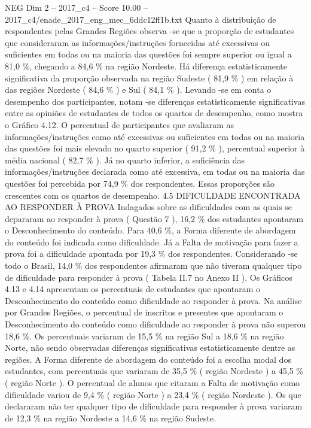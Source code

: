 \begin{textsample}{NEG Dim 2 – 2017\_c4 – Score 10.00 – 2017\_c4/enade\_2017\_eng\_mec\_6ddc12ff1b.txt}
Quanto à distribuição de respondentes pelas Grandes Regiões observa -se que a proporção de estudantes que consideraram as informações/instruções fornecidas até excessivas ou suficientes em todas ou na maioria das questões foi sempre superior ou igual a 81,0 \%, chegando a 84,6 \% na região Nordeste.
Há diferença estatisticamente significativa da proporção observada na região Sudeste ( 81,9 \% ) em relação à das regiões Nordeste ( 84,6 \% ) e Sul ( 84,1 \% ).
Levando -se em conta o desempenho dos participantes, notam -se diferenças estatisticamente significativas entre as opiniões de estudantes de todos os quartos de desempenho, como mostra o Gráfico 4.12.
O percentual de participantes que avaliaram as informações/instruções como até excessivas ou suficientes em todas ou na maioria das questões foi mais elevado no quarto superior ( 91,2 \% ), percentual superior à média nacional ( 82,7 \% ).
Já no quarto inferior, a suficiência das informações/instruções declarada como até excessiva, em todas ou na maioria das questões foi percebida por 74,9 \% dos respondentes.
Essas proporções são crescentes com os quartos de desempenho. 4.5 DIFICULDADE ENCONTRADA AO RESPONDER À PROVA Indagados sobre as dificuldades com as quais se depararam ao responder à prova ( Questão 7 ), 16,2 \% dos estudantes apontaram o Desconhecimento do conteúdo.
Para 40,6 \%, a Forma diferente de abordagem do conteúdo foi indicada como dificuldade.
Já a Falta de motivação para fazer a prova foi a dificuldade apontada por 19,3 \% dos respondentes.
Considerando -se todo o Brasil, 14,0 \% dos respondentes afirmaram que não tiveram qualquer tipo de dificuldade para responder à prova ( Tabela II.7 no Anexo II ).
Os Gráficos 4.13 e 4.14 apresentam os percentuais de estudantes que apontaram o Desconhecimento do conteúdo como dificuldade ao responder à prova.
Na análise por Grandes Regiões, o percentual de inscritos e presentes que apontaram o Desconhecimento do conteúdo como dificuldade ao responder à prova não superou 18,6 \%.
Os percentuais variaram de 15,5 \% na região Sul a 18,6 \% na região Norte, não sendo observadas diferenças significativas estatisticamente dentre as regiões.
A Forma diferente de abordagem do conteúdo foi a escolha modal dos estudantes, com percentuais que variaram de 35,5 \% ( região Nordeste ) a 45,5 \% ( região Norte ).
O percentual de alunos que citaram a Falta de motivação como dificuldade variou de 9,4 \% ( região Norte ) a 23,4 \% ( região Nordeste ).
Os que declararam não ter qualquer tipo de dificuldade para responder à prova variaram de 12,3 \% na região Nordeste a 14,6 \% na região Sudeste.

\end{textsample}
